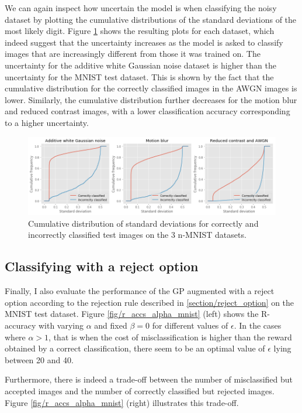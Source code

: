 \documentclass{article}
\begin{document}
We can again inspect how uncertain the model is when classifying the noisy dataset by plotting the cumulative distributions of the standard deviations of the most likely digit. Figure \ref{fig/noisy_mnist_cum_stds} shows the resulting plots for each dataset, which indeed suggest that the uncertainty increases as the model is asked to classify images that are increasingly different from those it was trained on. The uncertainty for the additive white Gaussian noise dataset is higher than the uncertainty for the MNIST test dataset. This is shown by the fact that the cumulative distribution for the correctly classified images in the AWGN images is lower. Similarly, the cumulative distribution further decreases for the motion blur and reduced contrast images, with a lower classification accuracy corresponding to a higher uncertainty.

\begin{figure}
	\centering
	\includegraphics[scale=0.4]{noisy_mnist_cum_stds}
	\caption{Cumulative distribution of standard deviations for correctly and incorrectly classified test images on the 3 n-MNIST datasets.}
	\label{fig/noisy_mnist_cum_stds}
\end{figure}

\subsection{Classifying with a reject option}
Finally, I also evaluate the performance of the GP augmented with a reject option according to the rejection rule described in \ref{section/reject_option} on the MNIST test dataset. Figure \ref{fig/r_accs_alpha_mnist} (left) shows the R-accuracy with varying $\alpha$ and fixed $\beta=0$ for different values of $\epsilon$. In the cases where $\alpha > 1$, that is when the cost of misclassification is higher than the reward obtained by a correct classification, there seem to be an optimal value of $\epsilon$ lying between 20 and 40. 

Furthermore, there is indeed a trade-off between the number of misclassified but accepted images and the number of correctly classified but rejected images. Figure \ref{fig/r_accs_alpha_mnist} (right) illustrates this trade-off.
\end{document}

